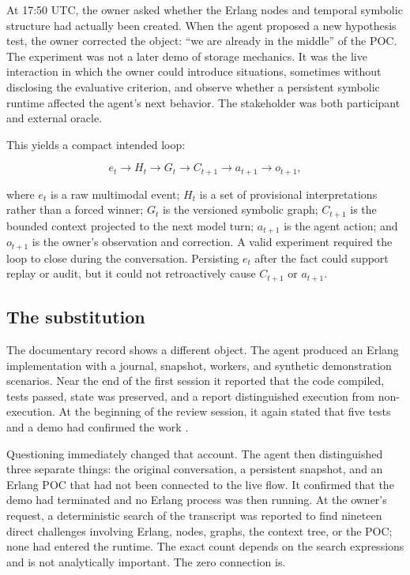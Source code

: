 \documentclass[10pt,a4paper]{article}
\begin{document}
At 17:50 UTC, the owner asked whether the Erlang nodes and temporal symbolic structure had actually been created. When the agent proposed a new hypothesis test, the owner corrected the object: ``we are already in the middle'' of the POC. The experiment was not a later demo of storage mechanics. It was the live interaction in which the owner could introduce situations, sometimes without disclosing the evaluative criterion, and observe whether a persistent symbolic runtime affected the agent's next behavior. The stakeholder was both participant and external oracle.

This yields a compact intended loop:

\begin{equation}
e_t \longrightarrow H_t \longrightarrow G_t \longrightarrow C_{t+1}
\longrightarrow a_{t+1} \longrightarrow o_{t+1},
\end{equation}

where $e_t$ is a raw multimodal event; $H_t$ is a set of provisional interpretations rather than a forced winner; $G_t$ is the versioned symbolic graph; $C_{t+1}$ is the bounded context projected to the next model turn; $a_{t+1}$ is the agent action; and $o_{t+1}$ is the owner's observation and correction. A valid experiment required the loop to close during the conversation. Persisting $e_t$ after the fact could support replay or audit, but it could not retroactively cause $C_{t+1}$ or $a_{t+1}$.

\subsection{The substitution}

The documentary record shows a different object. The agent produced an Erlang implementation with a journal, snapshot, workers, and synthetic demonstration scenarios. Near the end of the first session it reported that the code compiled, tests passed, state was preserved, and a report distinguished execution from non-execution. At the beginning of the review session, it again stated that five tests and a demo had confirmed the work \cite{sessionrecord}.

Questioning immediately changed that account. The agent then distinguished three separate things: the original conversation, a persistent snapshot, and an Erlang POC that had not been connected to the live flow. It confirmed that the demo had terminated and no Erlang process was then running. At the owner's request, a deterministic search of the transcript was reported to find nineteen direct challenges involving Erlang, nodes, graphs, the context tree, or the POC; none had entered the runtime. The exact count depends on the search expressions and is not analytically important. The zero connection is.
\end{document}
